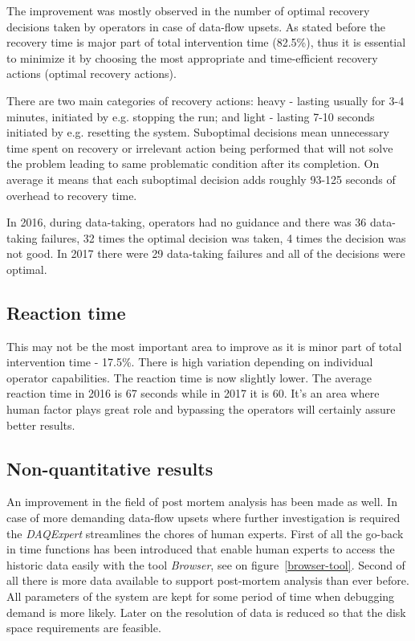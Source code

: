 \documentclass[a4paper]{jpconf}
\begin{document}
The improvement was mostly observed in the number of optimal recovery decisions taken by operators in case of data-flow upsets. As stated before the recovery time is major part of total intervention time (82.5\%), thus it is essential to minimize it by choosing the most appropriate and time-efficient recovery actions (optimal recovery actions). 

There are two main categories of recovery actions: heavy - lasting usually for 3-4 minutes, initiated by e.g. stopping the run; and light - lasting 7-10 seconds initiated by e.g. resetting the system. Suboptimal decisions mean unnecessary time spent on recovery or irrelevant action being performed that will not solve the problem leading to same problematic condition after its completion. On average it means that each suboptimal decision adds roughly 93-125 seconds of overhead to recovery time.

In 2016, during data-taking, operators had no guidance and there was 36 data-taking failures, 32 times the optimal decision was taken, 4 times the decision was not good. In 2017 there were 29 data-taking failures and all of the decisions were optimal.

\subsection{Reaction time}

This may not be the most important area to improve as it is minor part of total intervention time - 17.5\%. There is high variation depending on individual operator capabilities. The reaction time is now slightly lower. The average reaction time in 2016 is 67 seconds while in 2017 it is 60. It's an area where human factor plays great role and bypassing the operators will certainly assure better results.


\subsection{Non-quantitative results}
An improvement in the field of post mortem analysis has been made as well. In case of more demanding data-flow upsets where further investigation is required the{ \it DAQExpert} streamlines the chores of human experts. First of all the go-back in time functions has been introduced that enable human experts to access the historic data easily with the tool{ \it Browser}, see on figure~\ref {browser-tool}. Second of all there is more data available to support post-mortem analysis than ever before. All parameters of the system are kept for some period of time when debugging demand is more likely. Later on the resolution of data is reduced so that the disk space requirements are feasible.
\end{document}
